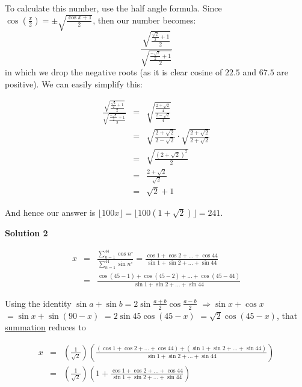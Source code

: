 \begin{enumerate}
 To calculate this number, use the half angle formula. Since $\cos\left(\frac{x}{2}\right) = \pm \sqrt{\frac{\cos x + 1}{2}}$, then our number becomes: 
 \[\frac{\sqrt{\frac{\frac{\sqrt{2}}{2} + 1}{2}}}{\sqrt{\frac{\frac{-\sqrt{2}}{2} + 1}{2}}}\] in which we drop the negative roots (as it is clear cosine of $22.5$ and $67.5$ are positive). We can easily simplify this:

 
 \begin{eqnarray*} \frac{\sqrt{\frac{\frac{\sqrt{2}}{2} + 1}{2}}}{\sqrt{\frac{\frac{-\sqrt{2}}{2} + 1}{2}}} &=& \sqrt{\frac{\frac{2+\sqrt{2}}{4}}{\frac{2-\sqrt{2}}{4}}} \\ &=& \sqrt{\frac{2+\sqrt{2}}{2-\sqrt{2}}} \cdot \sqrt{\frac{2+\sqrt{2}}{2+\sqrt{2}}} \\ &=& \sqrt{\frac{(2+\sqrt{2})^2}{2}} \\ &=& \frac{2+\sqrt{2}}{\sqrt{2}} \\ &=& \sqrt{2}+1 \end{eqnarray*}

 And hence our answer is $\lfloor 100x \rfloor =  \lfloor 100(1 + \sqrt {2}) \rfloor = \boxed{241}$.

 



\textbf{Solution 2}


 \begin{eqnarray*} x &=& \frac {\sum_{n = 1}^{44} \cos n^\circ}{\sum_{n = 1}^{44} \sin n^\circ} = \frac {\cos 1 + \cos 2 + \dots + \cos 44}{\sin 1 + \sin 2 + \dots + \sin 44}\\ &=& \frac {\cos (45 - 1) + \cos(45 - 2) + \dots + \cos(45 - 44)}{\sin 1 + \sin 2 + \dots + \sin 44} \end{eqnarray*}

 Using the identity $\sin a + \sin b = 2\sin \frac{a+b}2 \cos \frac{a-b}{2}$ $\Longrightarrow \sin x + \cos x$ $= \sin x + \sin (90-x)$ $= 2 \sin 45 \cos (45-x)$ $= \sqrt{2} \cos (45-x)$, that \href{https://artofproblemsolving.com/wiki/index.php?title=Summation}{summation} reduces to

 
 \begin{eqnarray*}x &=& \left(\frac {1}{\sqrt {2}}\right)\left(\frac {(\cos 1 + \cos2 + \dots + \cos44) + (\sin1 + \sin2 + \dots + \sin44)}{\sin1 + \sin2 + \dots + \sin44}\right)\\ &=& \left(\frac {1}{\sqrt {2}}\right)\left(1 + \frac {\cos 1 + \cos 2 + \dots + \cos 44}{\sin 1 + \sin 2 + \dots + \sin 44}\right) \end{eqnarray*}


\end{enumerate}
